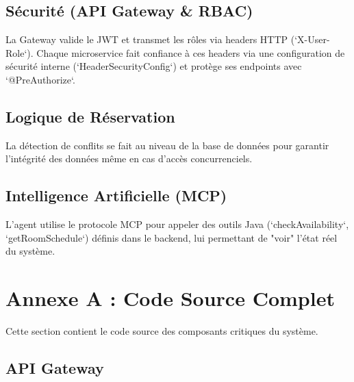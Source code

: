 \documentclass[12pt, a4paper]{report}
\begin{document}
\section{Sécurité (API Gateway \& RBAC)}
La Gateway valide le JWT et transmet les rôles via headers HTTP (`X-User-Role`).
Chaque microservice fait confiance à ces headers via une configuration de sécurité interne (`HeaderSecurityConfig`) et protège ses endpoints avec `@PreAuthorize`.

\section{Logique de Réservation}
La détection de conflits se fait au niveau de la base de données pour garantir l'intégrité des données même en cas d'accès concurrenciels.

\section{Intelligence Artificielle (MCP)}
L'agent utilise le protocole MCP pour appeler des outils Java (`checkAvailability`, `getRoomSchedule`) définis dans le backend, lui permettant de "voir" l'état réel du système.

\chapter{Annexe A : Code Source Complet}
Cette section contient le code source des composants critiques du système.

\section{API Gateway}
\end{document}
